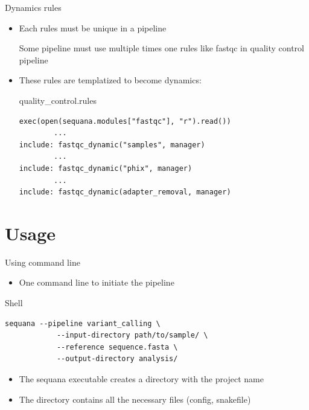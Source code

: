 \documentclass{beamer}
\begin{document}
\begin{frame}[fragile]{Dynamics rules}
    \begin{itemize}
        \item Each rules must be unique in a pipeline
        \begin{alertblock}{}
        Some pipeline must use multiple times one rules like fastqc in quality control pipeline
        \end{alertblock}
        \item These rules are templatized to become dynamics:
        \begin{block}{quality\_control.rules}
        \begin{lstlisting}
exec(open(sequana.modules["fastqc"], "r").read())
        ...
include: fastqc_dynamic("samples", manager)
        ...
include: fastqc_dynamic("phix", manager)
        ...
include: fastqc_dynamic(adapter_removal, manager)
        \end{lstlisting}
        \end{block}
    \end{itemize}
\end{frame}

\section{Usage}

\begin{frame}[fragile]{Using command line}
    \begin{itemize}
        \item One command line to initiate the pipeline
    \end{itemize}
    \begin{exampleblock}{Shell}
    \begin{lstlisting}[language={}]
    sequana --pipeline variant_calling \
            --input-directory path/to/sample/ \
            --reference sequence.fasta \
            --output-directory analysis/
    \end{lstlisting}
    \end{exampleblock}
    \begin{itemize}
        \item The sequana executable creates a directory with the project name
        \item The directory contains all the necessary files (config, snakefile)
    \end{itemize}
\end{frame}
\end{document}
